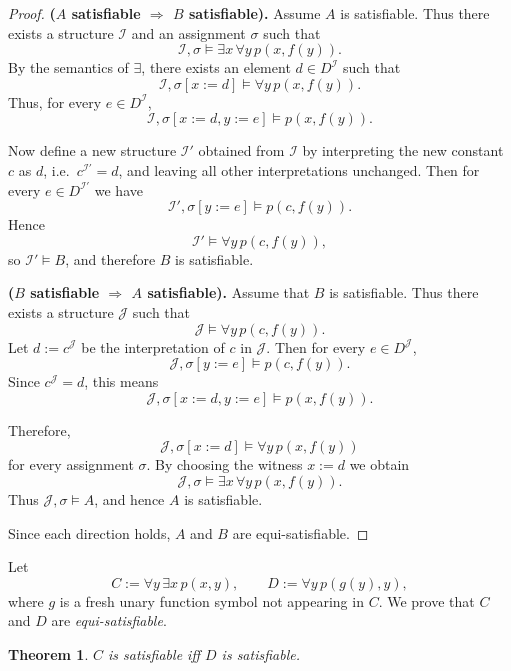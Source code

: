 \documentclass{article}
\theoremstyle{plain}
\newtheorem{theorem}{Theorem}
\theoremstyle{definition}
\theoremstyle{remark}
\begin{document}
\begin{proof}
\textbf{($A$ satisfiable $\Rightarrow$ $B$ satisfiable).}
Assume $A$ is satisfiable.
Thus there exists a structure $\mathcal{I}$ and an assignment $\sigma$
such that
\[
\mathcal{I},\sigma \models \exists x\,\forall y\,p(x,f(y)).
\]
By the semantics of $\exists$, there exists an element $d \in D^{\mathcal{I}}$
such that
\[
\mathcal{I},\sigma[x := d] \models \forall y\,p(x,f(y)).
\]
Thus, for every $e \in D^{\mathcal{I}}$,
\[
\mathcal{I},\sigma[x:=d,y:=e] \models p(x,f(y)).
\]

Now define a new structure $\mathcal{I}'$ obtained from $\mathcal{I}$
by interpreting the new constant $c$ as $d$,
i.e.\ $c^{\mathcal{I}'} = d$, and leaving all other interpretations unchanged.
Then for every $e \in D^{\mathcal{I}'}$ we have
\[
\mathcal{I}',\sigma[y:=e] \models p(c,f(y)).
\]
Hence
\[
\mathcal{I}' \models \forall y\,p(c,f(y)),
\]
so $\mathcal{I}' \models B$, and therefore $B$ is satisfiable.

\bigskip

\textbf{($B$ satisfiable $\Rightarrow$ $A$ satisfiable).}
Assume that $B$ is satisfiable.
Thus there exists a structure $\mathcal{J}$ such that
\[
\mathcal{J} \models \forall y\, p(c,f(y)).
\]
Let $d := c^{\mathcal{J}}$ be the interpretation of $c$ in $\mathcal{J}$.
Then for every $e \in D^{\mathcal{J}}$,
\[
\mathcal{J},\sigma[y:=e] \models p(c,f(y)).
\]
Since $c^{\mathcal{J}} = d$, this means
\[
\mathcal{J},\sigma[x:=d,y:=e] \models p(x,f(y)).
\]

Therefore,
\[
\mathcal{J},\sigma[x:=d] \models \forall y\,p(x,f(y))
\]
for every assignment $\sigma$.
By choosing the witness $x := d$ we obtain
\[
\mathcal{J},\sigma \models \exists x\,\forall y\, p(x,f(y)).
\]
Thus $\mathcal{J},\sigma \models A$, and hence $A$ is satisfiable.

\bigskip

Since each direction holds, $A$ and $B$ are equi-satisfiable.
\end{proof}
\newpage
Let
\[
C := \forall y\,\exists x\,p(x,y),
\qquad
D := \forall y\,p(g(y),y),
\]
where $g$ is a fresh unary function symbol not appearing in $C$.
We prove that $C$ and $D$ are \emph{equi-satisfiable}.

\begin{theorem}
$C$ is satisfiable iff $D$ is satisfiable.
\end{theorem}
\end{document}
